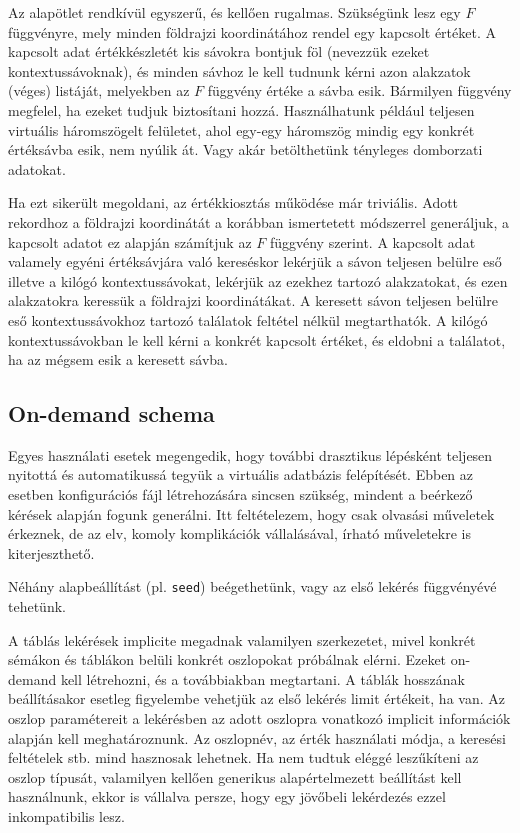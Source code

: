 \documentclass[
    parspace,
    noindent,
    nohyp,
]{elteiktdk}[2023/04/10]
\begin{document}
Az alapötlet rendkívül egyszerű, és kellően rugalmas.
Szükségünk lesz egy $F$ függvényre, mely minden földrajzi koordinátához rendel egy kapcsolt értéket.
A kapcsolt adat értékkészletét kis sávokra bontjuk föl (nevezzük ezeket kontextussávoknak),
és minden sávhoz le kell tudnunk kérni azon alakzatok (véges) listáját,
melyekben az $F$ függvény értéke a sávba esik.
Bármilyen függvény megfelel, ha ezeket tudjuk biztosítani hozzá.
Használhatunk például teljesen virtuális háromszögelt felületet,
ahol egy-egy háromszög mindig egy konkrét értéksávba esik, nem nyúlik át.
Vagy akár betölthetünk tényleges domborzati adatokat.

Ha ezt sikerült megoldani, az értékkiosztás működése már triviális.
Adott rekordhoz a földrajzi koordinátát a korábban ismertetett módszerrel generáljuk,
a kapcsolt adatot ez alapján számítjuk az $F$ függvény szerint.
A kapcsolt adat valamely egyéni értéksávjára való kereséskor
lekérjük a sávon teljesen belülre eső illetve a kilógó kontextussávokat,
lekérjük az ezekhez tartozó alakzatokat,
és ezen alakzatokra keressük a földrajzi koordinátákat.
A keresett sávon teljesen belülre eső kontextussávokhoz tartozó találatok feltétel nélkül megtarthatók.
A kilógó kontextussávokban le kell kérni a konkrét kapcsolt értéket,
és eldobni a találatot, ha az mégsem esik a keresett sávba.

\subsection{On-demand schema}

Egyes használati esetek megengedik,
hogy további drasztikus lépésként teljesen nyitottá és automatikussá tegyük a virtuális adatbázis felépítését.
Ebben az esetben konfigurációs fájl létrehozására sincsen szükség,
mindent a beérkező kérések alapján fogunk generálni.
Itt feltételezem, hogy csak olvasási műveletek érkeznek,
de az elv, komoly komplikációk vállalásával, írható műveletekre is kiterjeszthető.

Néhány alapbeállítást (pl. \texttt{seed}) beégethetünk, vagy az első lekérés függvényévé tehetünk.

A táblás lekérések implicite megadnak valamilyen szerkezetet,
mivel konkrét sémákon és táblákon belüli konkrét oszlopokat próbálnak elérni.
Ezeket on-demand kell létrehozni, és a továbbiakban megtartani.
A táblák hosszának beállításakor esetleg figyelembe vehetjük az első lekérés limit értékeit, ha van.
Az oszlop paramétereit a lekérésben az adott oszlopra vonatkozó
implicit információk alapján kell meghatároznunk.
Az oszlopnév, az érték használati módja, a keresési feltételek stb.
mind hasznosak lehetnek.
Ha nem tudtuk eléggé leszűkíteni az oszlop típusát,
valamilyen kellően generikus alapértelmezett beállítást kell használnunk,
ekkor is vállalva persze, hogy egy jövőbeli lekérdezés ezzel inkompatibilis lesz.
\end{document}
